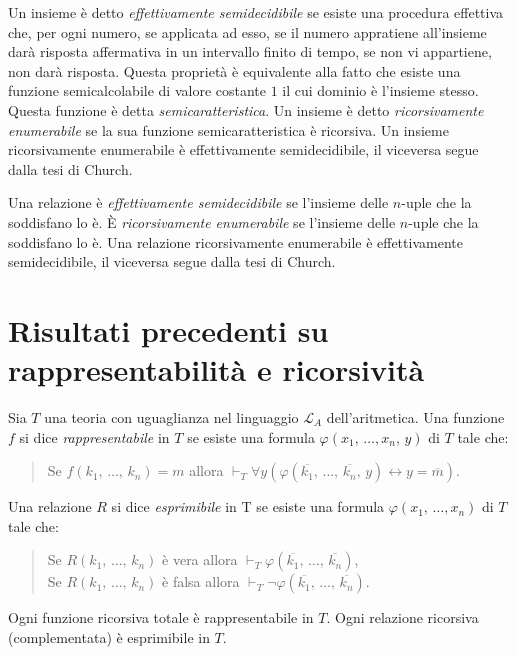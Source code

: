 	Un insieme \`e detto \textit{\emph{effettivamente semidecidibile}}
	se esiste una
	procedura effettiva che, per ogni numero, se applicata ad esso, se il numero
	appratiene all'insieme dar\`a risposta affermativa in un intervallo finito di
	tempo, se non vi appartiene, non dar\`a risposta.
	Questa propriet\`a \`e equivalente alla fatto che esiste una funzione
	semicalcolabile di valore costante $1$ il cui dominio \`e l'insieme stesso.
	Questa funzione \`e detta \textit{\emph{semicaratteristica}}.
	Un insieme \`e detto \emph{\textit{ricorsivamente enumerabile}} se
	la sua funzione semicaratteristica \`e ricorsiva.
	Un insieme ricorsivamente enumerabile \`e effettivamente semidecidibile,
	il viceversa segue dalla tesi di Church.
	
	Una relazione \`e \textit{\emph{effettivamente semidecidibile}}
	se l'insieme
	delle $n$-uple che la soddisfano lo \`e. \`E
	\textit{\emph{ricorsivamente enumerabile}}
	se l'insieme delle $n$-uple che la soddisfano lo \`e. Una relazione
	ricorsivamente enumerabile \`e effettivamente semidecidibile,
	il viceversa segue dalla tesi di Church.

\section{Risultati precedenti su rappresentabilit\`a
e ricorsivit\`a}
	Sia $T$ una teoria con uguaglianza nel linguaggio $\mathcal{L}_A$
	dell'aritmetica. Una funzione $f$ si dice \emph{\textit{rappresentabile}}
	in $T$ se esiste una formula $\varphi(x_1,\,\dots,x_n,\,y)$ di $T$
	tale che:\\
	
	\begin{quote}
	Se $f(k_1,\,\dots,\,k_n)=m$ allora $\vdash_T\forall y(\varphi(
	\overline{k_1},\,\dots,\,\overline{k_n},\,y)\leftrightarrow y=\overline{m})$.
	\end{quote}
	Una relazione $R$ si dice \emph{esprimibile} in T se
	esiste una formula $\varphi(x_1,\,\dots,x_n)$ di $T$
	tale che:\\
	
	\begin{quote}
	Se $R(k_1,\,\dots,\,k_n)$ \`e vera allora $\vdash_T\varphi(\overline{k_1},\,
	\dots,\,\overline{k_n})$,\\
	Se $R(k_1,\,\dots,\,k_n)$ \`e falsa allora $\vdash_T\neg\varphi(\overline{k_1},\,
	\dots,\,\overline{k_n})$.\\
	\end{quote}
	Ogni funzione ricorsiva totale \`e rappresentabile in $T$. Ogni relazione
	ricorsiva (complementata) \`e esprimibile in $T$.
	
